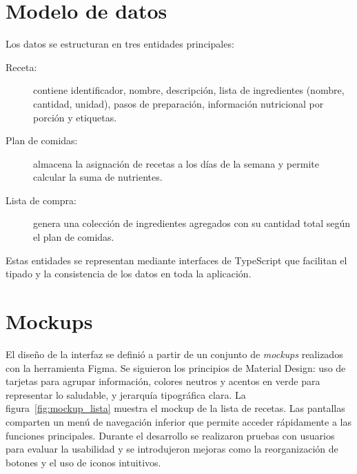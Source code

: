 \documentclass[twoside, openright, 11pt]{report}
\begin{document}
\section{Modelo de datos}
Los datos se estructuran en tres entidades principales:
\begin{description}
  \item[Receta:] contiene identificador, nombre, descripción, lista de ingredientes (nombre, cantidad, unidad), pasos de preparación, información nutricional por porción y etiquetas.
  \item[Plan de comidas:] almacena la asignación de recetas a los días de la semana y permite calcular la suma de nutrientes.
  \item[Lista de compra:] genera una colección de ingredientes agregados con su cantidad total según el plan de comidas.
\end{description}
Estas entidades se representan mediante interfaces de TypeScript que facilitan el tipado y la consistencia de los datos en toda la aplicación.

\section{Mockups}
El diseño de la interfaz se definió a partir de un conjunto de \emph{mockups} realizados con la herramienta Figma. Se siguieron los principios de Material Design: uso de tarjetas para agrupar información, colores neutros y acentos en verde para representar lo saludable, y jerarquía tipográfica clara. La figura~\ref{fig:mockup_lista} muestra el mockup de la lista de recetas. Las pantallas comparten un menú de navegación inferior que permite acceder rápidamente a las funciones principales. Durante el desarrollo se realizaron pruebas con usuarios para evaluar la usabilidad y se introdujeron mejoras como la reorganización de botones y el uso de iconos intuitivos.
\end{document}
